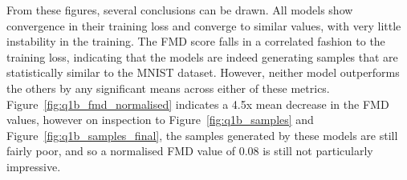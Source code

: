 From these figures, several conclusions can be drawn.
All models show convergence in their training loss and converge to similar values, with very little instability in the training.
The FMD score falls in a correlated fashion to the training loss, indicating that the models are indeed generating samples
that are statistically similar to the MNIST dataset.
However, neither model outperforms the others by any significant means across either of these metrics.
Figure~\eqref{fig:q1b_fmd_normalised} indicates a 4.5x mean decrease in the FMD values, however on inspection to
Figure~\eqref{fig:q1b_samples} and Figure~\eqref{fig:q1b_samples_final}, the samples generated by these models are still
fairly poor, and so a normalised FMD value of 0.08 is still not particularly impressive.
